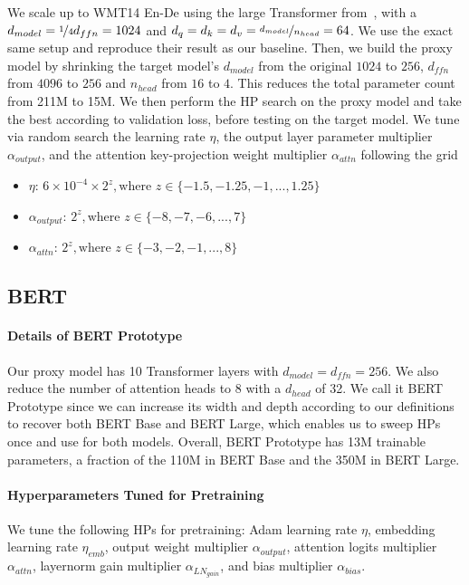 \documentclass{article}
\theoremstyle{definition}
\begin{document}
We scale up to WMT14 En-De using the large Transformer from~\cite{DBLP:journals/corr/VaswaniSPUJGKP17}, with a $d_{model}=\nicefrac{1}{4}d_{ffn}=1024$ and $d_{q}=d_{k}=d_{v}=\nicefrac{d_{model}}{n_{head}}=64$.
We use the exact same setup and reproduce their result as our baseline.
Then, we build the proxy model by shrinking the target model's $d_{model}$ from the original $1024$ to $256$, $d_{ffn}$ from $4096$ to $256$ and $n_{head}$ from $16$ to $4$.
This reduces the total parameter count from 211M to 15M.
We then perform the HP search on the proxy model and take the best according to validation loss, before testing on the target model.
We tune via random search the learning rate $\eta$, the output layer parameter multiplier $\alpha_{output}$, and the attention key-projection weight multiplier $\alpha_{attn}$ following the grid
\begin{itemize}
    \item $\eta$: $6 \times 10^{-4} \times 2^z, \text{where } z\in \{-1.5, -1.25, -1, ..., 1.25\}$
    \item $\alpha_{output}$: $2^z, \text{where } z\in \{-8, -7, -6, ..., 7\}$
    \item $\alpha_{attn}$: $2^z, \text{where } z\in\{-3, -2, -1, ..., 8\}$
\end{itemize}

\subsection{BERT}
\label{app:bert}
\label{app:bert_prototype}

\paragraph{Details of BERT Prototype}
Our proxy model has 10 Transformer layers with $d_{model}=d_{ffn}=256$.
We also reduce the number of attention heads to 8 with a $d_{head}$ of 32.
We call it BERT Prototype since we can increase its width and depth according to our definitions to recover both BERT Base and BERT Large, which enables us to sweep HPs once and use for both models.
Overall, BERT Prototype has 13M trainable parameters, a fraction of the 110M in BERT Base and the 350M in BERT Large.

\paragraph{Hyperparameters Tuned for Pretraining}
We tune the following HPs for pretraining: Adam learning rate $\eta$, embedding learning rate $\eta_{emb}$, output weight multiplier $\alpha_{output}$, attention logits multiplier $\alpha_{attn}$, layernorm gain multiplier $\alpha_{LN_{gain}}$, and bias multiplier $\alpha_{bias}$.
\end{document}
